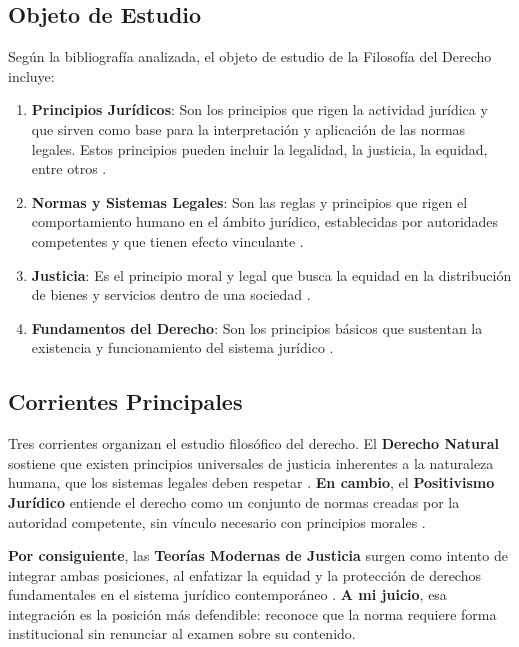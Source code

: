 \documentclass[
	spanish, %
	letterpaper, oneside
]{article}
\begin{document}
\subsection{Objeto de Estudio}

Según la bibliografía analizada, el objeto de estudio de la Filosofía del Derecho incluye:

\begin{enumerate}
	\item \textbf{Principios Jurídicos}: Son los principios que rigen la actividad jurídica y que sirven como base para la interpretación y aplicación de las normas legales. Estos principios pueden incluir la legalidad, la justicia, la equidad, entre otros \cite{finnisEstudiosTeoriaDerecho2017,lovonManualPracticoFilosofia2020}.
	\item \textbf{Normas y Sistemas Legales}: Son las reglas y principios que rigen el comportamiento humano en el ámbito jurídico, establecidas por autoridades competentes y que tienen efecto vinculante \cite{rojas-gonzalezFilosofiaDerecho2018,lastraConceptosJuridicosFundamentales}.
	\item \textbf{Justicia}: Es el principio moral y legal que busca la equidad en la distribución de bienes y servicios dentro de una sociedad \cite{finnisEstudiosTeoriaDerecho2017,lovonManualPracticoFilosofia2020}.
	\item \textbf{Fundamentos del Derecho}: Son los principios básicos que sustentan la existencia y funcionamiento del sistema jurídico \cite{ruizrodriguezFilosofiaDerecho2009,lastraConceptosJuridicosFundamentales}.
\end{enumerate}

\subsection{Corrientes Principales}

Tres corrientes organizan el estudio filosófico del derecho. El \textbf{Derecho Natural} sostiene que existen principios universales de justicia inherentes a la naturaleza humana, que los sistemas legales deben respetar \cite{finnisEstudiosTeoriaDerecho2017}. \textbf{En cambio}, el \textbf{Positivismo Jurídico} entiende el derecho como un conjunto de normas creadas por la autoridad competente, sin vínculo necesario con principios morales \cite{ruizrodriguezFilosofiaDerecho2009}.

\textbf{Por consiguiente}, las \textbf{Teorías Modernas de Justicia} surgen como intento de integrar ambas posiciones, al enfatizar la equidad y la protección de derechos fundamentales en el sistema jurídico contemporáneo \cite{lovonManualPracticoFilosofia2020,lastraConceptosJuridicosFundamentales}. \textbf{A mi juicio}, esa integración es la posición más defendible: reconoce que la norma requiere forma institucional sin renunciar al examen sobre su contenido.
\end{document}
